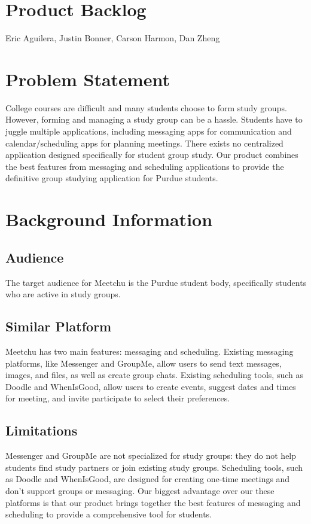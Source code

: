 \documentclass[12pt]{article}
\newcommand{\hwTitle}{Product Backlog}
\newcommand{\authorName}{Eric Aguilera, Justin Bonner, Carson Harmon, Dan Zheng}
\begin{document}
\section*{\Large \centering \hwTitle}
{\centering \authorName \par}

\section{Problem Statement}

College courses are difficult and many students choose to form study groups. However, forming and managing a study group can be a hassle. Students have to juggle multiple applications, including messaging apps for communication and calendar/scheduling apps for planning meetings. There exists no centralized application designed specifically for student group study. Our product combines the best features from messaging and scheduling applications to provide the definitive group studying application for Purdue students.

\section{Background Information}

\subsection*{Audience}

The target audience for Meetchu is the Purdue student body, specifically students who are active in study groups.

\subsection*{Similar Platform}

Meetchu has two main features: messaging and scheduling. Existing messaging platforms, like Messenger and GroupMe, allow users to send text messages, images, and files, as well as create group chats. Existing scheduling tools, such as Doodle and WhenIsGood, allow users to create events, suggest dates and times for meeting, and invite participate to select their preferences.

\subsection*{Limitations}

Messenger and GroupMe are not specialized for study groups: they do not help students find study partners or join existing study groups. Scheduling tools, such as Doodle and WhenIsGood, are designed for creating one-time meetings and don't support groups or messaging. Our biggest advantage over our these platforms is that our product brings together the best features of messaging and scheduling to provide a comprehensive tool for students.
\end{document}
